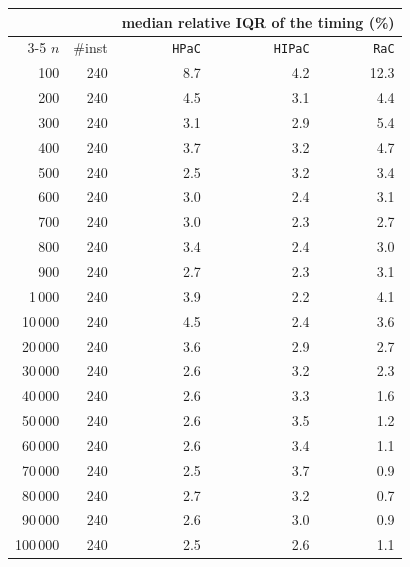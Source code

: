 \begin{tabular}{@{}rrrrr@{}}
\toprule
 &  & \multicolumn{3}{c}{median relative IQR of the timing (\%)} \\
\cmidrule(l){3-5}
$n$ & \#inst & \texttt{HPaC} & \texttt{HIPaC} & \texttt{RaC} \\
\midrule
100 & 240 & 8.7 & 4.2 & 12.3 \\
200 & 240 & 4.5 & 3.1 & 4.4 \\
300 & 240 & 3.1 & 2.9 & 5.4 \\
400 & 240 & 3.7 & 3.2 & 4.7 \\
500 & 240 & 2.5 & 3.2 & 3.4 \\
600 & 240 & 3.0 & 2.4 & 3.1 \\
700 & 240 & 3.0 & 2.3 & 2.7 \\
800 & 240 & 3.4 & 2.4 & 3.0 \\
900 & 240 & 2.7 & 2.3 & 3.1 \\
1\,000 & 240 & 3.9 & 2.2 & 4.1 \\
10\,000 & 240 & 4.5 & 2.4 & 3.6 \\
20\,000 & 240 & 3.6 & 2.9 & 2.7 \\
30\,000 & 240 & 2.6 & 3.2 & 2.3 \\
40\,000 & 240 & 2.6 & 3.3 & 1.6 \\
50\,000 & 240 & 2.6 & 3.5 & 1.2 \\
60\,000 & 240 & 2.6 & 3.4 & 1.1 \\
70\,000 & 240 & 2.5 & 3.7 & 0.9 \\
80\,000 & 240 & 2.7 & 3.2 & 0.7 \\
90\,000 & 240 & 2.6 & 3.0 & 0.9 \\
100\,000 & 240 & 2.5 & 2.6 & 1.1 \\
\bottomrule
\end{tabular}
